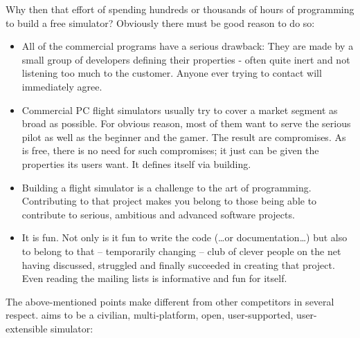 Why then that effort of spending hundreds or thousands of hours of
programming to build a free simulator? Obviously there must be
good reason to do so:

\begin{itemize}
 \item All of the commercial programs have a serious drawback: They are made
 by a small group of developers defining their properties - often
 quite inert and not listening too much to the customer.
 Anyone ever trying to contact  will
 immediately agree.
 \item Commercial PC flight simulators usually try to cover a market
 segment as broad as possible. For obvious reason, most of them want
 to serve the serious pilot as well as the beginner and the gamer.
 The result are compromises. As \FlightGear is free, there is no need
 for such compromises; it just can be given the properties its users
 want. It defines itself via building.
 \item Building a flight simulator is a challenge to the art of
 programming. Contributing to that project makes you belong to
 those being able to contribute to serious, ambitious and
 advanced software projects.
 \item It is fun. Not only is it fun to write the code (\ldots or
 documentation\ldots) but also to belong to that -- temporarily changing
 -- club of clever people on the net having discussed, struggled and finally
 succeeded in creating that project. Even reading the \FlightGear
 mailing lists is informative and fun for itself.
\end{itemize}

The above-mentioned points make \FlightGear different from other
competitors in several respect. \FlightGear aims to be a
civilian,
multi-platform,
open, user-supported, user-extensible simulator:

